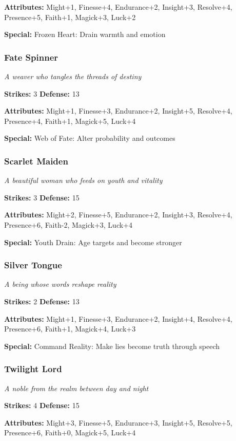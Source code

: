 \documentclass[10pt,twoside]{article}
\begin{document}
\textbf{Attributes:} Might+1, Finesse+4, Endurance+2, Insight+3, Resolve+4, Presence+5, Faith+1, Magick+3, Luck+2

\textbf{Special:} Frozen Heart: Drain warmth and emotion

\subsubsection{Fate Spinner}
\textit{A weaver who tangles the threads of destiny}

\textbf{Strikes:} 3 \quad \textbf{Defense:} 13

\textbf{Attributes:} Might+1, Finesse+3, Endurance+2, Insight+5, Resolve+4, Presence+4, Faith+1, Magick+5, Luck+4

\textbf{Special:} Web of Fate: Alter probability and outcomes

\subsubsection{Scarlet Maiden}
\textit{A beautiful woman who feeds on youth and vitality}

\textbf{Strikes:} 3 \quad \textbf{Defense:} 15

\textbf{Attributes:} Might+2, Finesse+5, Endurance+2, Insight+3, Resolve+4, Presence+6, Faith-2, Magick+3, Luck+4

\textbf{Special:} Youth Drain: Age targets and become stronger

\subsubsection{Silver Tongue}
\textit{A being whose words reshape reality}

\textbf{Strikes:} 2 \quad \textbf{Defense:} 13

\textbf{Attributes:} Might+1, Finesse+3, Endurance+2, Insight+4, Resolve+4, Presence+6, Faith+1, Magick+4, Luck+3

\textbf{Special:} Command Reality: Make lies become truth through speech

\subsubsection{Twilight Lord}
\textit{A noble from the realm between day and night}

\textbf{Strikes:} 4 \quad \textbf{Defense:} 15

\textbf{Attributes:} Might+3, Finesse+5, Endurance+3, Insight+5, Resolve+5, Presence+6, Faith+0, Magick+5, Luck+4
\end{document}
